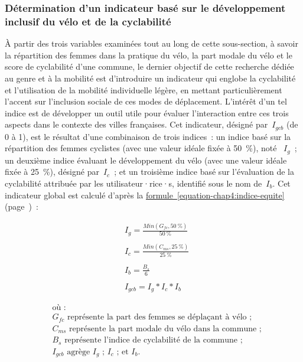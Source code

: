 \begin{refsegment}
\subsubsection*{Détermination d'un indicateur basé sur le développement inclusif du vélo et de la cyclabilité
    \label{chap4:definition-indicateur-genre}
    }

À partir des trois variables examinées tout au long de cette sous-section, à savoir la répartition des femmes dans la pratique du vélo, la part modale du vélo et le score de cyclabilité d'une commune, le dernier objectif de cette recherche dédiée au genre et à la mobilité est d'introduire un indicateur qui englobe la cyclabilité et l'utilisation de la mobilité individuelle légère, en mettant particulièrement l'accent sur l'inclusion sociale de ces modes de déplacement. L'intérêt d'un tel indice est de développer un outil utile pour évaluer l'interaction entre ces trois aspects dans le contexte des villes françaises. Cet indicateur, désigné par~\(I_{gcb}\) (de 0 à 1), est le résultat d'une combinaison de trois indices~: un indice basé sur la répartition des femmes cyclistes (avec une valeur idéale fixée à 50~\%), noté ~\(I_{g}\)~; un deuxième indice évaluant le développement du vélo (avec une valeur idéale fixée à 25~\%), désigné par~\(I_{c}\)~; et un troisième indice basé sur l'évaluation de la cyclabilité attribuée par les utilisateur·rice·s, identifié sous le nom de~\(I_{b}\). Cet indicateur global est calculé d'après la \hyperref[equation-chap4:indice-equite]{formule~\ref{equation-chap4:indice-equite}} (page~\pageref{equation-chap4:indice-equite})~:%

    \begin{equation}
    \label{equation-chap4:indice-equite}
    \begin{aligned}
&I_{g} = \frac{Min(G_{fc}, 50~\%)}{50~\%}
    \\\\
&I_{c} = \frac{Min(C_{ms}, 25~\%)}{25~\%}
    \\\\
&I_{b} = \frac{B_{s}}{6}
    \\\\
&I_{gcb} = I_{g} * I_{c} * I_{b}
    \end{aligned}
    \end{equation}

    \begin{align*}
        &\text{où~:} \\
&G_{fc} \text{ représente la part des femmes se déplaçant à vélo~;} \\
&C_{ms} \text{ représente la part modale du vélo dans la commune~;} \\
&B_{s} \text{ représente l'indice de cyclabilité de la commune~;} \\
&I_{gcb} \text{ agrège }I_{g}\text{ ; }I_{c}\text{ ; et }I_{b}\text{.}
    \end{align*}


\end{refsegment}
